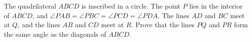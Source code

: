 The quadrilateral $ABCD$ is inscribed in a circle. The point $P$ lies in the interior of $ABCD$,  and $\angle P AB = \angle P BC = \angle P CD = \angle P DA$. The lines $AD$ and $BC$ meet at $Q$,  and the lines $AB$ and $CD$ meet at $R$. Prove that the lines $P Q$ and $P R$ form the same angle as the diagonals of $ABCD$.